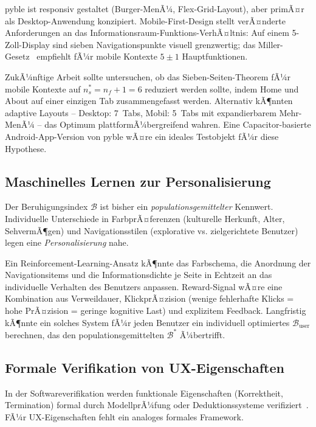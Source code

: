 ﻿\documentclass[a4paper,12pt]{article}
\theoremstyle{definition}
\begin{document}
pyble ist responsiv gestaltet (Burger-MenÃ¼, Flex-Grid-Layout), aber
primÃ¤r als Desktop-Anwendung konzipiert. Mobile-First-Design stellt
verÃ¤nderte Anforderungen an das Informationsraum-Funktions-VerhÃ¤ltnis:
Auf einem 5-Zoll-Display sind sieben Navigationspunkte visuell grenzwertig;
das Miller-Gesetz~\cite{miller1956} empfiehlt fÃ¼r mobile Kontexte $5 \pm 1$
Hauptfunktionen.

ZukÃ¼nftige Arbeit sollte untersuchen, ob das Sieben-Seiten-Theorem fÃ¼r
mobile Kontexte auf $n_s^* = n_f + 1 = 6$ reduziert werden sollte,
indem Home und About auf einer einzigen Tab zusammengefasst werden.
Alternativ kÃ¶nnten adaptive Layouts -- Desktop: 7~Tabs, Mobil: 5~Tabs
mit expandierbarem Mehr-MenÃ¼ -- das Optimum plattformÃ¼bergreifend wahren.
Eine Capacitor-basierte Android-App-Version von pyble wÃ¤re ein
ideales Testobjekt fÃ¼r diese Hypothese.

\subsection{Maschinelles Lernen zur Personalisierung}

Der Beruhigungsindex $\mathcal{B}$ ist bisher ein \emph{populationsgemittelter}
Kennwert. Individuelle Unterschiede in FarbprÃ¤ferenzen (kulturelle Herkunft,
Alter, SehvermÃ¶gen) und Navigationsstilen (explorative vs. zielgerichtete
Benutzer) legen eine \emph{Personalisierung} nahe.

Ein Reinforcement-Learning-Ansatz kÃ¶nnte das Farbschema, die Anordnung
der Navigationsitems und die Informationsdichte je Seite in Echtzeit an
das individuelle Verhalten des Benutzers anpassen. Reward-Signal wÃ¤re
eine Kombination aus Verweildauer, KlickprÃ¤zision (wenige fehlerhafte
Klicks = hohe PrÃ¤zision = geringe kognitive Last) und explizitem Feedback.
Langfristig kÃ¶nnte ein solches System fÃ¼r jeden Benutzer ein individuell
optimiertes $\mathcal{B}_{\text{user}}$ berechnen, das den
populationsgemittelten $\mathcal{B}^*$ Ã¼bertrifft.

\subsection{Formale Verifikation von UX-Eigenschaften}

In der Softwareverifikation werden funktionale Eigenschaften (Korrektheit,
Termination) formal durch ModellprÃ¼fung oder Deduktionssysteme verifiziert~\cite{dijkstra1982}.
FÃ¼r UX-Eigenschaften fehlt ein analoges formales Framework.
\end{document}
